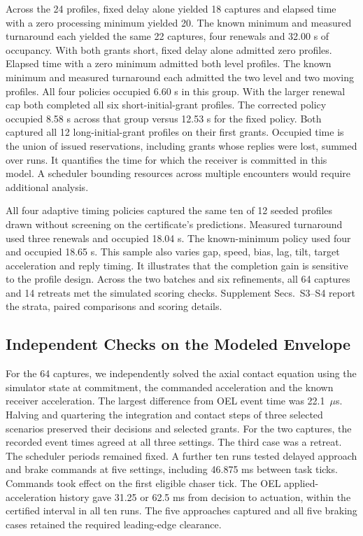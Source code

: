 \documentclass{IEEEtaes}
\begin{document}
Across the 24 profiles, fixed delay alone yielded 18 captures and elapsed time with a zero processing minimum yielded 20. The known minimum and measured turnaround each yielded the same 22 captures, four renewals and 32.00 s of occupancy. With both grants short, fixed delay alone admitted zero profiles. Elapsed time with a zero minimum admitted both level profiles. The known minimum and measured turnaround each admitted the two level and two moving profiles. All four policies occupied 6.60 s in this group. With the larger renewal cap both completed all six short-initial-grant profiles. The corrected policy occupied 8.58 s across that group versus 12.53 s for the fixed policy. Both captured all 12 long-initial-grant profiles on their first grants. Occupied time is the union of issued reservations, including grants whose replies were lost, summed over runs. It quantifies the time for which the receiver is committed in this model. A scheduler bounding resources across multiple encounters would require additional analysis.

All four adaptive timing policies captured the same ten of 12 seeded profiles drawn without screening on the certificate's predictions. Measured turnaround used three renewals and occupied 18.04 s. The known-minimum policy used four and occupied 18.65 s. This sample also varies gap, speed, bias, lag, tilt, target acceleration and reply timing. It illustrates that the completion gain is sensitive to the profile design. Across the two batches and six refinements, all 64 captures and 14 retreats met the simulated scoring checks. Supplement Secs.~S3--S4 report the strata, paired comparisons and scoring details.

\subsection{Independent Checks on the Modeled Envelope}

For the 64 captures, we independently solved the axial contact equation using the simulator state at commitment, the commanded acceleration and the known receiver acceleration. The largest difference from OEL event time was 22.1~$\mu$s. Halving and quartering the integration and contact steps of three selected scenarios preserved their decisions and selected grants. For the two captures, the recorded event times agreed at all three settings. The third case was a retreat. The scheduler periods remained fixed. A further ten runs tested delayed approach and brake commands at five settings, including 46.875 ms between task ticks. Commands took effect on the first eligible chaser tick. The OEL applied-acceleration history gave 31.25 or 62.5 ms from decision to actuation, within the certified interval in all ten runs. The five approaches captured and all five braking cases retained the required leading-edge clearance.
\end{document}
